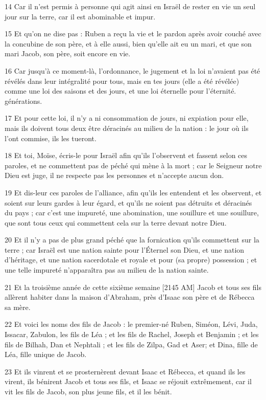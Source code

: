 \par 14 Car il n'est permis à personne qui agit ainsi en Israël de rester en vie un seul jour sur la terre, car il est abominable et impur.
\par 15 Et qu'on ne dise pas : Ruben a reçu la vie et le pardon après avoir couché avec la concubine de son père, et à elle aussi, bien qu'elle ait eu un mari, et que son mari Jacob, son père, soit encore en vie.
\par 16 Car jusqu'à ce moment-là, l'ordonnance, le jugement et la loi n'avaient pas été révélés dans leur intégralité pour tous, mais en tes jours (elle a été révélée) comme une loi des saisons et des jours, et une loi éternelle pour l'éternité. générations.
\par 17 Et pour cette loi, il n'y a ni consommation de jours, ni expiation pour elle, mais ils doivent tous deux être déracinés au milieu de la nation : le jour où ils l'ont commise, ils les tueront.
\par 18 Et toi, Moïse, écris-le pour Israël afin qu'ils l'observent et fassent selon ces paroles, et ne commettent pas de péché qui mène à la mort ; car le Seigneur notre Dieu est juge, il ne respecte pas les personnes et n'accepte aucun don.
\par 19 Et dis-leur ces paroles de l'alliance, afin qu'ils les entendent et les observent, et soient sur leurs gardes à leur égard, et qu'ils ne soient pas détruits et déracinés du pays ; car c'est une impureté, une abomination, une souillure et une souillure, que sont tous ceux qui commettent cela sur la terre devant notre Dieu.
\par 20 Et il n'y a pas de plus grand péché que la fornication qu'ils commettent sur la terre ; car Israël est une nation sainte pour l'Éternel son Dieu, et une nation d'héritage, et une nation sacerdotale et royale et pour (sa propre) possession ; et une telle impureté n'apparaîtra pas au milieu de la nation sainte.
\par 21 Et la troisième année de cette sixième semaine [2145 AM] Jacob et tous ses fils allèrent habiter dans la maison d'Abraham, près d'Isaac son père et de Rébecca sa mère.
\par 22 Et voici les noms des fils de Jacob : le premier-né Ruben, Siméon, Lévi, Juda, Issacar, Zabulon, les fils de Léa ; et les fils de Rachel, Joseph et Benjamin ; et les fils de Bilhah, Dan et Nephtali ; et les fils de Zilpa, Gad et Aser; et Dina, fille de Léa, fille unique de Jacob.
\par 23 Et ils vinrent et se prosternèrent devant Isaac et Rébecca, et quand ils les virent, ils bénirent Jacob et tous ses fils, et Isaac se réjouit extrêmement, car il vit les fils de Jacob, son plus jeune fils, et il les bénit.

